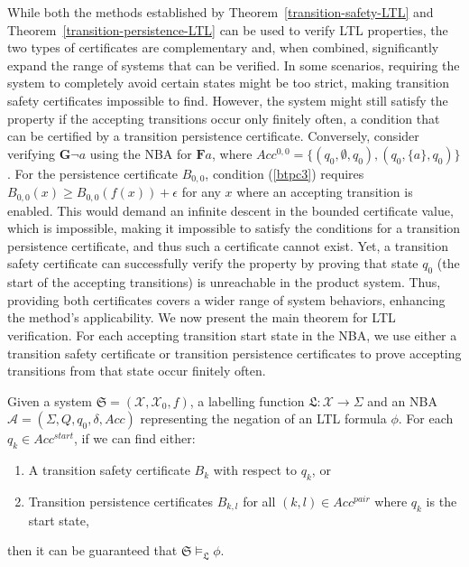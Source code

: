 While both the methods established by Theorem~\ref{transition-safety-LTL} and Theorem~\ref{transition-persistence-LTL} can be used to verify LTL properties, the two types of certificates are complementary and, when combined, significantly expand the range of systems that can be verified. In some scenarios, requiring the system to completely avoid certain states might be too strict, making transition safety certificates impossible to find. However, the system might still satisfy the property if the accepting transitions occur only finitely often, a condition that can be certified by a transition persistence certificate. Conversely, consider verifying $\mathbf{G} \neg a$ using the NBA for $\mathbf{F} a$, where $Acc^{0,0} = \{(q_0, \emptyset, q_0), (q_0, \{a\}, q_0)\}$. For the persistence certificate $B_{0,0}$, condition (\ref{btpc3}) requires $B_{0,0}(x) \geq B_{0,0}(f(x)) + \epsilon$ for any $x$ where an accepting transition is enabled. This would demand an infinite descent in the bounded certificate value, which is impossible, making it impossible to satisfy the conditions for a transition persistence certificate, and thus such a certificate cannot exist. Yet, a transition safety certificate can successfully verify the property by proving that state $q_0$ (the start of the accepting transitions) is unreachable in the product system. Thus, providing both certificates covers a wider range of system behaviors, enhancing the method's applicability. We now present the main theorem for LTL verification. For each accepting transition start state in the NBA, we use either a transition safety certificate or transition persistence certificates to prove accepting transitions from that state occur finitely often.

\begin{theorem}
  \label{ltl-verification-theorem}
  Given a system $\mathfrak{S} = (\mathcal{X}, \mathcal{X}_0, f)$, a labelling function $\mathfrak{L}: \mathcal{X} \rightarrow \Sigma$ and an NBA $\mathcal{A} = (\Sigma, Q, q_0, \delta, Acc)$ representing the negation of an LTL formula $\phi$. For each $q_k \in Acc^{start}$, if we can find either:
  \begin{enumerate}
    \item A transition safety certificate $B_k$ with respect to $q_k$, or
    \item Transition persistence certificates $B_{k,l}$ for all $(k, l) \in Acc^{pair}$ where $q_k$ is the start state,
  \end{enumerate}
  then it can be guaranteed that $\mathfrak{S} \models_{\mathfrak{L}} \phi$.
\end{theorem}

